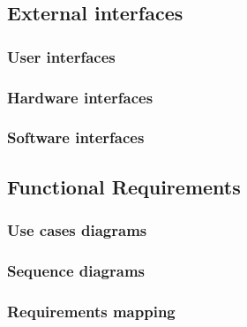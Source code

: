 \subsection{External interfaces}
\subsubsection{User interfaces}
\subsubsection{Hardware interfaces}
\subsubsection{Software interfaces}

\subsection{Functional Requirements}
\subsubsection{Use cases diagrams}
\subsubsection{Sequence diagrams}
\subsubsection{Requirements mapping}

